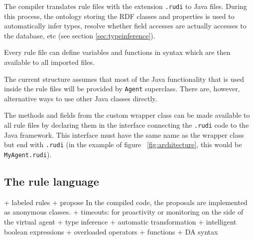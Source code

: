 The \vonda compiler translates rule files with the extension \texttt{.rudi} to Java files. During this process, the ontology storing the RDF classes and properties is used to automatically infer types, resolve whether field accesses are actually accesses to the database, etc (see section \ref{sec:typeinference}).

Every rule file can define variables and functions in \vonda syntax which are
then available to all imported files.

The current structure assumes that most of the Java functionality that is used
inside the rule files will be provided by \texttt{Agent} superclass. There are,
however, alternative ways to use other Java classes directly.

The methods and fields from the custom wrapper class can be made available to all rule files by declaring them in the interface connecting the \texttt{.rudi} code to the Java framework. This interface must have the same name as the wrapper class but end with \texttt{.rudi} (in the example of figure ~\ref{fig:architecture}, this would be \texttt{MyAgent.rudi}).





\subsection{The \vonda rule language}

\label{sec:language}

+ labeled rules
+ propose
  In the compiled code, the proposals are implemented as anonymous classes.
+ timeouts: for proactivity or monitoring on the side of the virtual agent
+ type inference
+ automatic transformation
+ intelligent boolean expressions
+ overloaded operators
+ functions
+ DA syntax

